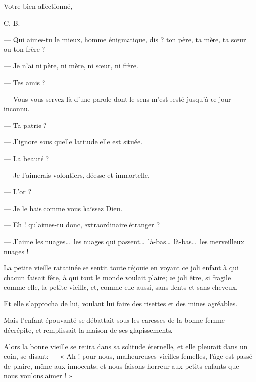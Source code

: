 \begin{flushright}
Votre bien affectionné, 

C. B.
\end{flushright}


\setcounter{secnumdepth}{4} %


--- Qui aimes{}-tu le mieux, homme énigmatique, dis ? ton père, ta mère,
ta s\oe ur ou ton frère ?

--- Je n’ai ni père, ni mère, ni s\oe ur, ni frère.

--- Tes amis ?

--- Vous vous servez là d’une parole dont le sens
m’est resté jusqu’à ce jour inconnu.

--- Ta patrie ?

--- J’ignore sous quelle latitude elle est située.

--- La beauté ?

--- Je l’aimerais volontiers, déesse et immortelle.

--- L’or ?

--- Je le hais comme vous haïssez Dieu.

--- Eh ! qu’aimes{}-tu donc, extraordinaire étranger ?

--- J’aime les nuages\ldots\ les nuages qui passent\ldots\ 
là{}-bas\ldots\ là{}-bas\ldots\ les merveilleux nuages !


La petite vieille ratatinée se sentit toute réjouie en voyant ce joli
enfant à qui chacun faisait fête, à qui tout le monde voulait plaire;
ce joli être, si fragile comme elle, la petite vieille, et, comme elle
aussi, sans dents et sans cheveux.

Et elle s’approcha de lui, voulant lui faire des
risettes et des mines agréables.

Mais l’enfant épouvanté se débattait sous les caresses
de la bonne femme décrépite, et remplissait la maison de ses
glapissements.

Alors la bonne vieille se retira dans sa solitude éternelle, et elle
pleurait dans un coin, se disant: --- « Ah ! pour nous, malheureuses
vieilles femelles, l’âge est passé de plaire, même aux
innocents; et nous faisons horreur aux petits enfants que nous voulons
aimer ! »


